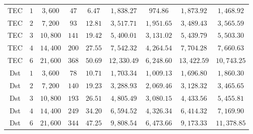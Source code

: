 \begin{table}[H]
\begin{tabularx}{\textwidth}{CCCCCCCCC}
TEC & $1$ & $3,600$ & $47$ & $6.47$ & $1,838.27$ & $974.86$ & $1,873.92$ & $1,468.92$ \\
TEC & $2$ & $7,200$ & $93$ & $12.81$ & $3,517.71$ & $1,951.65$ & $3,489.43$ & $3,565.59$ \\
TEC & $3$ & $10,800$ & $141$ & $19.42$ & $5,400.01$ & $3,131.02$ & $5,439.79$ & $5,503.30$ \\
TEC & $4$ & $14,400$ & $200$ & $27.55$ & $7,542.32$ & $4,264.54$ & $7,704.28$ & $7,660.63$ \\
TEC & $6$ & $21,600$ & $368$ & $50.69$ & $12,330.49$ & $6,248.60$ & $13,422.59$ & $10,743.25$ \\
Dst & $1$ & $3,600$ & $78$ & $10.71$ & $1,703.34$ & $1,009.13$ & $1,696.80$ & $1,860.30$ \\
Dst & $2$ & $7,200$ & $140$ & $19.23$ & $3,288.93$ & $2,069.46$ & $3,128.32$ & $3,465.65$ \\
Dst & $3$ & $10,800$ & $193$ & $26.51$ & $4,805.49$ & $3,080.15$ & $4,433.56$ & $5,455.81$ \\
Dst & $4$ & $14,400$ & $249$ & $34.20$ & $6,594.52$ & $4,326.34$ & $6,414.32$ & $7,169.90$ \\
Dst & $6$ & $21,600$ & $344$ & $47.25$ & $9,808.54$ & $6,473.66$ & $9,173.33$ & $11,378.85$ \\
\bottomrule
\end{tabularx}
\end{table}
\vspace{-3pt}
